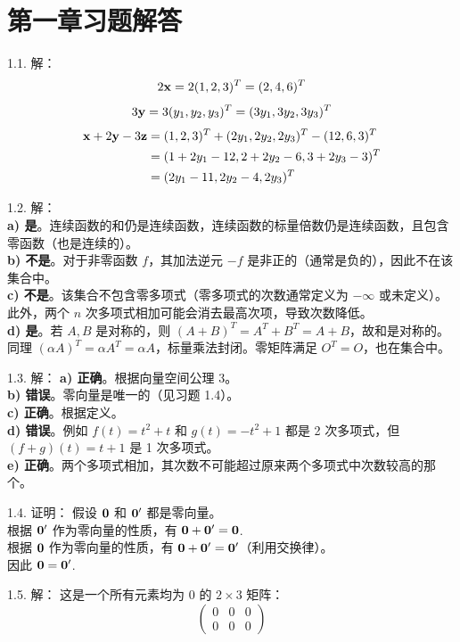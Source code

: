 \section*{第一章习题解答}
\begin{exer}

1.1. 解：
$$2\mathbf{x} = 2(1, 2, 3)^T = (2, 4, 6)^T$$
$$3\mathbf{y} = 3(y_1, y_2, y_3)^T = (3y_1, 3y_2, 3y_3)^T$$
$$
\begin{aligned}
\mathbf{x} + 2\mathbf{y} - 3\mathbf{z} &= (1, 2, 3)^T + (2y_1, 2y_2, 2y_3)^T - (12, 6, 3)^T \\
&= (1 + 2y_1 - 12, 2 + 2y_2 - 6, 3 + 2y_3 - 3)^T \\
&= (2y_1 - 11, 2y_2 - 4, 2y_3)^T
\end{aligned}
$$

1.2. 解：
\\
\textbf{a) 是}。连续函数的和仍是连续函数，连续函数的标量倍数仍是连续函数，且包含零函数（也是连续的）。
\\
\textbf{b) 不是}。对于非零函数 $f$，其加法逆元 $-f$ 是非正的（通常是负的），因此不在该集合中。
\\
\textbf{c) 不是}。该集合不包含零多项式（零多项式的次数通常定义为 $-\infty$ 或未定义）。此外，两个 $n$ 次多项式相加可能会消去最高次项，导致次数降低。
\\
\textbf{d) 是}。若 $A, B$ 是对称的，则 $(A+B)^T = A^T + B^T = A + B$，故和是对称的。同理 $(\alpha A)^T = \alpha A^T = \alpha A$，标量乘法封闭。零矩阵满足 $O^T = O$，也在集合中。

1.3. 解：
\textbf{a) 正确}。根据向量空间公理 3。
\\
\textbf{b) 错误}。零向量是唯一的（见习题 1.4）。
\\
\textbf{c) 正确}。根据定义。
\\
\textbf{d) 错误}。例如 $f(t) = t^2 + t$ 和 $g(t) = -t^2 + 1$ 都是 2 次多项式，但 $(f+g)(t) = t+1$ 是 1 次多项式。
\\
\textbf{e) 正确}。两个多项式相加，其次数不可能超过原来两个多项式中次数较高的那个。

1.4. 证明：
假设 $\mathbf{0}$ 和 $\mathbf{0}'$ 都是零向量。
\\
根据 $\mathbf{0}'$ 作为零向量的性质，有 $\mathbf{0} + \mathbf{0}' = \mathbf{0}$.~
\\
根据 $\mathbf{0}$ 作为零向量的性质，有 $\mathbf{0} + \mathbf{0}' = \mathbf{0}'$（利用交换律）。
\\
因此 $\mathbf{0} = \mathbf{0}'$.~

1.5. 解：
这是一个所有元素均为 0 的 $2 \times 3$ 矩阵：
$$
\begin{pmatrix}
0 & 0 & 0 \\
0 & 0 & 0
\end{pmatrix}
$$


\end{exer}
